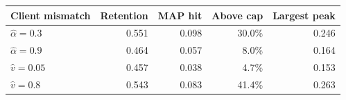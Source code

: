 \begin{tabular}{lrrrr}
\toprule
Client mismatch & Retention & MAP hit & Above cap & Largest peak \\
\midrule
$\widehat\alpha=0.3$ & 0.551 & 0.098 & 30.0\% & 0.246 \\
$\widehat\alpha=0.9$ & 0.464 & 0.057 & 8.0\% & 0.164 \\
$\widehat v=0.05$ & 0.457 & 0.038 & 4.7\% & 0.153 \\
$\widehat v=0.8$ & 0.543 & 0.083 & 41.4\% & 0.263 \\
\bottomrule
\end{tabular}